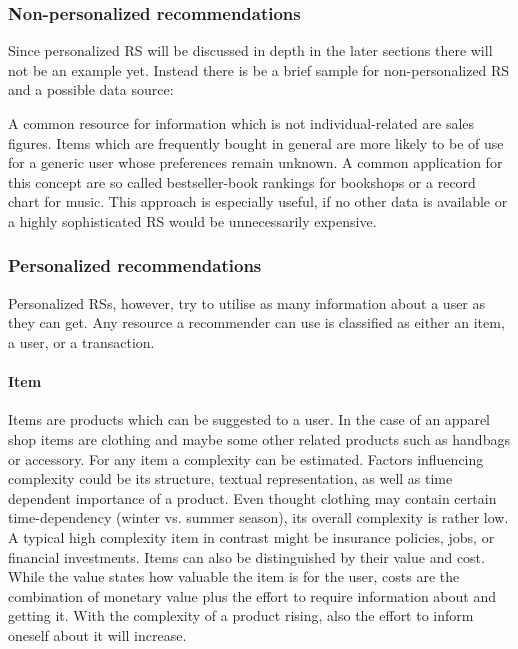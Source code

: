 \subsubsection{Non-personalized recommendations}
Since personalized RS will be discussed in depth in the later sections there will not be an example yet.
Instead there is be a brief sample for non-personalized RS and a possible data source:

A common resource for information which is not individual-related are sales figures.
Items which are frequently bought in general are more likely to be of use for a generic user whose preferences remain unknown.
\citep[p.~10-11]{ricci:2011}
A common application for this concept are so called bestseller-book rankings for bookshops or a record chart for music.
This approach is especially useful, if no other data is available or a highly sophisticated RS would be unnecessarily expensive.

\subsubsection{Personalized recommendations}
Personalized RSs, however, try to utilise as many information about a user as they can get.
Any resource a recommender can use is classified as either an item, a user, or a transaction.

\paragraph{Item}
Items are products which can be suggested to a user.
In the case of an apparel shop items are clothing and maybe some other related products such as handbags or accessory.
For any item a complexity can be estimated.
Factors influencing complexity could be its structure, textual representation, as well as time dependent importance of a product.
Even thought clothing may contain certain time-dependency (winter vs. summer season), its overall complexity is rather low.
A typical high complexity item in contrast might be insurance policies, jobs, or financial investments.
Items can also be distinguished by their value and cost.
While the value states how valuable the item is for the user, costs are the combination of monetary value plus the effort to require information about and getting it.
With the complexity of a product rising, also the effort to inform oneself about it will increase.
\citep[p.~8]{ricci:2011}

